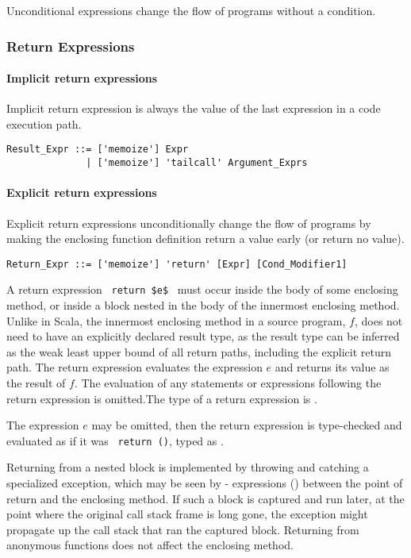 Unconditional expressions change the flow of programs without a condition. 






\subsubsection{Return Expressions}
\label{sec:return-expressions}

\paragraph{Implicit return expressions}
Implicit return expression is always the value of the last expression in a code execution path. 

\syntax\begin{lstlisting}
Result_Expr ::= ['memoize'] Expr
              | ['memoize'] 'tailcall' Argument_Exprs
\end{lstlisting}

\paragraph{Explicit return expressions}
Explicit return expressions unconditionally change the flow of programs by making the enclosing function definition return a value early (or return no value). 

\syntax\begin{lstlisting}
Return_Expr ::= ['memoize'] 'return' [Expr] [Cond_Modifier1]
\end{lstlisting}

A return expression ~\lstinline!return $e$!~ must occur inside the body of some enclosing method, or inside a block nested in the body of the innermost enclosing method. Unlike in Scala, the innermost enclosing method in a source program, $f$, does not need to have an explicitly declared result type, as the result type can be inferred as the weak least upper bound of all return paths, including the explicit return path. The return expression evaluates the expression $e$ and returns its value as the result of $f$. The evaluation of any statements or expressions following the return expression is omitted.The type of a return expression is .

The expression $e$ may be omitted, then the return expression  is type-checked and evaluated as if it was ~\lstinline!return ()!, typed as . 

Returning from a nested block is implemented by throwing and catching a specialized exception, which may be seen by - expressions () between the point of return and the enclosing method. If such a block is captured and run later, at the point where the original call stack frame is long gone, the exception might propagate up the call stack that ran the captured block. Returning from anonymous functions does not affect the enclosing method. 

